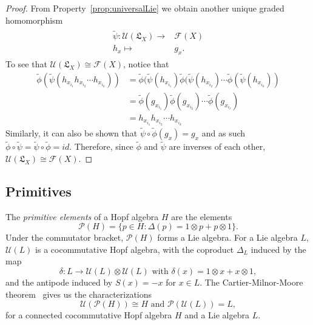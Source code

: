 \documentclass[11pt]{amsart}
\theoremstyle{definition}
\numberwithin{equation}{section}
\begin{document}
\begin{proof}
    From Property~\ref{prop:universalLie} we obtain another unique graded homomorphism 
    \begin{align*}
        \begin{array}{rcl}
            \tilde{\psi}: \mathcal{U}(\mathfrak{L}_{X}) \longrightarrow & \mathcal{F} (X) \\
            h_x \longmapsto & g_x.
        \end{array}
    \end{align*}
    To see that \(\mathcal{U}(\mathfrak{L}_{X}) \cong \mathcal{F}(X)\), notice that
    \begin{align*}
        \tilde{\phi}(\tilde{\psi}(h_{x_{i_{1}} }h_{x_{i_{2}}} \cdots h_{x_{i_{k}}}))  
        &= \tilde{\phi}(\tilde{\psi}(h_{x_{i_{1}} })\tilde{\phi}(\tilde{\psi}(h_{x_{i_{2}} } )\cdots \tilde{\phi}(\tilde{\psi}(h_{x_{i_{k}} })) \\
        &=  \tilde{\phi}(g_{x_{i_{1}} })\tilde{\phi}(g_{x_{i_{2}} })\cdots \tilde{\phi}(g_{x_{i_{\ell}} })\\
        &= h_{x_{i_{1}} }h_{x_{i_{2}} } \cdots h_{x_{i_{k}} }
    \end{align*} 
    Similarly, it can also be shown that \(\tilde{\psi} \circ \tilde{\phi} (g_x) = g_x\) and as such \(\tilde{\phi} \circ \tilde{\psi} = \tilde{\psi} \circ \tilde{\phi} = id\).
    Therefore, since \(\tilde{\phi}\) and \(\tilde{\psi}\) are inverses of each other,  \(\mathcal{U}(\mathfrak{L}_{X}) \cong \mathcal{F}(X)\).
\end{proof}

%

\subsection{Primitives}

The \textit{primitive elements} of a Hopf algebra $H$ are the elements 
\[
\mathcal{P}(H)=\{p\in H:\Delta (p)=1\otimes p + p\otimes 1\}.
\]
Under the commutator bracket, $\mathcal{P}(H)$ forms a Lie algebra. For a Lie algebra $L$, $\mathcal{U}(L)$ is a cocommutative Hopf algebra, with the coproduct $\Delta_L$ induced by the map
\[
\delta :L\to \mathcal{U}(L)\otimes\mathcal{U}(L) \text{  with  }\delta(x)=1\otimes x + x\otimes 1,
\] 
and the antipode induced by $S(x)=-x$ for $x\in L.$
The Cartier-Milnor-Moore theorem~\cite[see Theorem 5.18]{MM65} gives us the characterizations
\[
\mathcal{U}(\mathcal{P}(H))\cong H \text{ and } \mathcal{P}(\mathcal{U}(L))=L,
\]
for a connected cocommutative Hopf algebra $H$ and a Lie algebra $L$.
\end{document}

